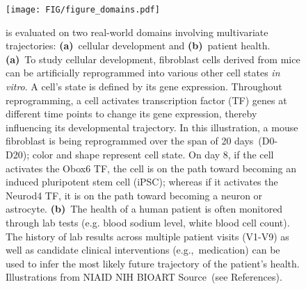 \begin{figure}[ht]
\begin{center}
\centerline{\texttt{[image: FIG/figure\_domains.pdf]}}
\caption{\name is evaluated on two real-world domains involving multivariate trajectories: \textbf{(a)}~cellular development and \textbf{(b)}~patient health. \textbf{(a)}~To study cellular development, fibroblast cells derived from mice can be artificially reprogrammed into various other cell states \textit{in vitro}. A cell's state is defined by its gene expression. Throughout reprogramming, a cell activates transcription factor (TF) genes at different time points to change its gene expression, thereby influencing its developmental trajectory. In this illustration, a mouse fibroblast is being reprogrammed over the span of 20 days~(D0-D20); color and shape represent cell state. On day 8, if the cell activates the Obox6 TF, the cell is on the path toward becoming an induced pluripotent stem cell (iPSC); whereas if it activates the Neurod4 TF, it is on the path toward becoming a neuron or astrocyte. \textbf{(b)}~The health of a human patient is often monitored through lab tests (e.g. blood sodium level, white blood cell count). The history of lab results across multiple patient visits (V1-V9) as well as candidate clinical interventions (e.g.,~medication) can be used to infer the most likely future trajectory of the patient's health. Illustrations from NIAID NIH BIOART Source~(see References). \nocite{fibroblast1,fibroblast2, fibroblast3, astrocyte, progenitor, petri, generic_immune, cajal, neuron, unidentified_offtarget, mouse, patient, syringe, wbc, hemoglobin, vial}}
\label{fig:data}
\end{center}
\vskip -0.35in
\end{figure}



